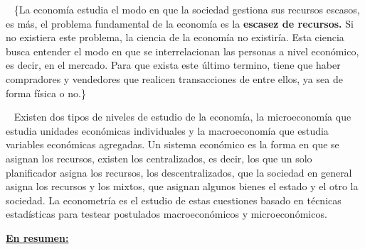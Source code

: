 \documentclass[
  letterpaper,
  DIV=11,
  numbers=noendperiod]{scrreport}
\begin{document}
~ \{\color{red}La economía estudia el modo en que la sociedad gestiona
sus recursos escasos, es más, el problema fundamental de la economía es
la \textbf{escasez de recursos.} Si no existiera este problema, la
ciencia de la economía no existiría. Esta ciencia busca entender el modo
en que se interrelacionan las personas a nivel económico, es decir, en
el mercado. Para que exista este último termino, tiene que haber
compradores y vendedores que realicen transacciones de entre ellos, ya
sea de forma física o no.\}

\color{black}

~ Existen dos tipos de niveles de estudio de la economía, la
microeconomía que estudia unidades económicas individuales y la
macroeconomía que estudia variables económicas agregadas. Un sistema
económico es la forma en que se asignan los recursos, existen los
centralizados, es decir, los que un solo planificador asigna los
recursos, los descentralizados, que la sociedad en general asigna los
recursos y los mixtos, que asignan algunos bienes el estado y el otro la
sociedad. La econometría es el estudio de estas cuestiones basado en
técnicas estadísticas para testear postulados macroeconómicos y
microeconómicos.

\underline{\textbf{En resumen:}}
\end{document}
